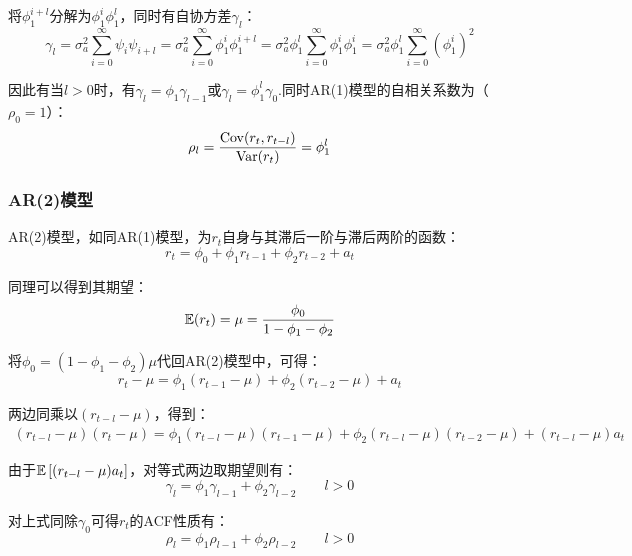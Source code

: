 \documentclass[11pt]{article}
\begin{document}
将$\phi_1^{i+l}$分解为$\phi_1^{i}\phi_1^{l}$，同时有自协方差$\gamma_l$：
\begin{equation*}
    \gamma_l = \sigma_{a}^{2} \sum_{i=0}^{\infty} \psi_i \psi_{i+l} 
    = \sigma_{a}^{2} \sum_{i=0}^{\infty} \phi_1^i \phi_1^{i+l} 
    = \sigma_{a}^{2} \phi_1^{l} \sum_{i=0}^{\infty} \phi_1^i \phi_1^{i} 
    = \sigma_{a}^{2} \phi_1^{l} \sum_{i=0}^{\infty} \left( \phi_1^i \right)^2
\end{equation*}

因此有当$l>0$时，有$\gamma_l=\phi_1 \gamma_{l-1}$或$\gamma_l=\phi_1^l \gamma_{0}$.同时AR(1)模型的自相关系数为（$\rho_0=1$）：
\begin{equation*}
    \rho_l = \frac{\operatorname{Cov}(r_t,r_{t-l})}{\operatorname{Var}(r_t)} = \phi_1^l
\end{equation*}

\subsubsection*{AR(2)模型}

AR(2)模型，如同AR(1)模型，为$r_t$自身与其滞后一阶与滞后两阶的函数：
\begin{equation*}
    r_t = \phi_0 + \phi_1 r_{t-1} + \phi_2 r_{t-2} + a_t
\end{equation*}

同理可以得到其期望：
\begin{equation*}
    \mathbb{E}(r_t) = \mu = \frac{\phi_0}{1-\phi_1-\phi_2}
\end{equation*}

将$\phi_0 = (1-\phi_1-\phi_2)\mu$代回AR(2)模型中，可得：
\begin{equation*}
    r_t - \mu = \phi_1(r_{t-1}-\mu) + \phi_2(r_{t-2}-\mu) + a_t
\end{equation*}

两边同乘以$(r_{t-l}-\mu)$，得到：
\begin{align*}
    (r_{t-l} - \mu)(r_t - \mu) = \phi_1 (r_{t-l}-\mu)(r_{t-1} - \mu)
    + \phi_2 (r_{t-l}-\mu)(r_{t-2} - \mu) + (r_{t-l}-\mu) a_t
\end{align*}

由于$\mathbb{E}\left[(r_{t-l} - \mu)a_t\right]$，对等式两边取期望则有：
\begin{equation*}
    \gamma_l = \phi_1 \gamma_{l-1} + \phi_2 \gamma_{l-2} \qquad l>0
\end{equation*}

对上式同除$\gamma_0$可得$r_t$的ACF性质有：
\begin{equation*}
    \rho_l = \phi_1 \rho_{l-1} + \phi_2 \rho_{l-2} \qquad l>0
\end{equation*}
\end{document}
